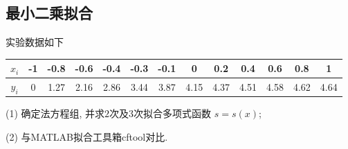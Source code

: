 \subsection{最小二乘拟合}
\begin{ex}
	实验数据如下
	
	\begin{tabular}{|c|c|c|c|c|c|c|c|c|c|c|c|c|}
		\hline$x_i$ & -1 & -0.8 & -0.6 & -0.4 & -0.3 & -0.1 & 0 & 0.2 & 0.4 & 0.6 & 0.8 & 1 \\
		\hline $y_i$ & 0 & 1.27 & 2.16 & 2.86 & 3.44 & 3.87 & 4.15 & 4.37 & 4.51 & 4.58 & 4.62 & 4.64 \\
		\hline
	\end{tabular}
	
	(1) 确定法方程组, 并求$ 2 $次及$ 3 $次拟合多项式函数 $s=s(x)$;
	
	(2) 与MATLAB拟合工具箱cftool对比.
\end{ex}

